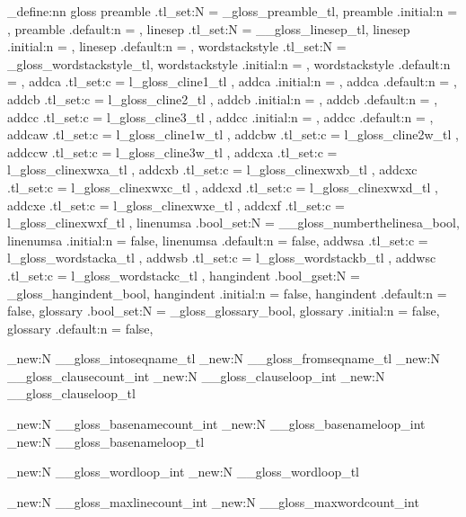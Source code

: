 \keys_define:nn { gloss }
{
preamble .tl_set:N = \g_gloss_preamble_tl,
preamble .initial:n = {},
preamble .default:n = {},
linesep .tl_set:N = \g__gloss_linesep_tl,
linesep .initial:n = {},
linesep .default:n = {},
wordstackstyle .tl_set:N = \g_gloss_wordstackstyle_tl,
wordstackstyle .initial:n = \colorbox{blue!12},
wordstackstyle .default:n = \colorbox{blue!12},
addca .tl_set:c = { l_gloss_cline1_tl },
addca .initial:n = {},
addca .default:n = {},
addcb .tl_set:c = { l_gloss_cline2_tl },
addcb .initial:n = {},
addcb .default:n = {},
addcc .tl_set:c = { l_gloss_cline3_tl },
addcc .initial:n = {},
addcc .default:n = {},
addcaw .tl_set:c = { l_gloss_cline1w_tl },
addcbw .tl_set:c = { l_gloss_cline2w_tl },
addccw .tl_set:c = { l_gloss_cline3w_tl },
addcxa .tl_set:c = { l_gloss_clinexwxa_tl },
addcxb .tl_set:c = { l_gloss_clinexwxb_tl },
addcxc .tl_set:c = { l_gloss_clinexwxc_tl },
addcxd .tl_set:c = { l_gloss_clinexwxd_tl },
addcxe .tl_set:c = { l_gloss_clinexwxe_tl },
addcxf .tl_set:c = { l_gloss_clinexwxf_tl },
linenumsa .bool_set:N = \g__gloss_numberthelinesa_bool,
linenumsa .initial:n = false,
linenumsa .default:n = false,
addwsa .tl_set:c = { l_gloss_wordstacka_tl },
addwsb .tl_set:c = { l_gloss_wordstackb_tl },
addwsc .tl_set:c = { l_gloss_wordstackc_tl },
hangindent .bool_gset:N = \g_gloss_hangindent_bool,
hangindent .initial:n = false,
hangindent .default:n = false,
glossary .bool_set:N = \g_gloss_glossary_bool,
glossary .initial:n = false,
glossary .default:n = false,
}



\tl_new:N \g__gloss_intoseqname_tl
\tl_new:N \g__gloss_fromseqname_tl
\int_new:N \g__gloss_clausecount_int
\int_new:N \g__gloss_clauseloop_int
\tl_new:N \g__gloss_clauseloop_tl

\int_new:N \g__gloss_basenamecount_int
\int_new:N \g__gloss_basenameloop_int
\tl_new:N \g__gloss_basenameloop_tl

\int_new:N \g__gloss_wordloop_int
\tl_new:N \g__gloss_wordloop_tl

\int_new:N \g__gloss_maxlinecount_int
\int_new:N \g__gloss_maxwordcount_int

